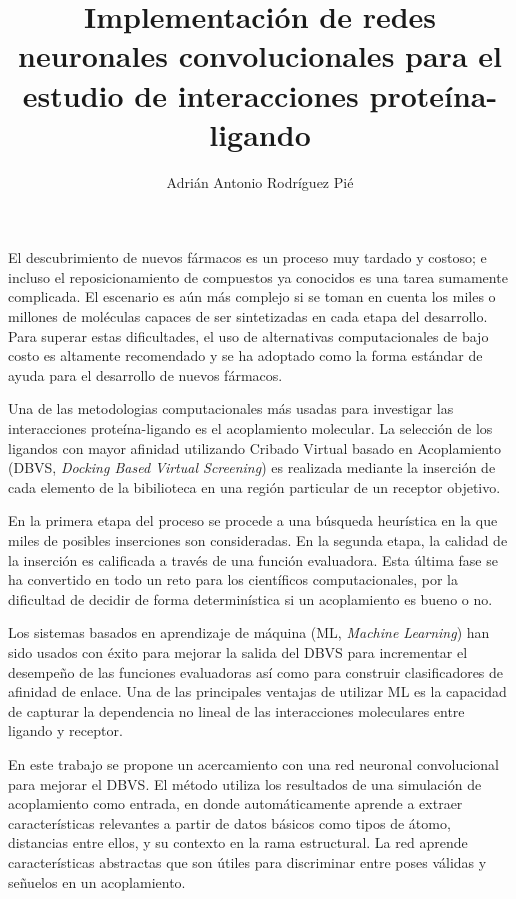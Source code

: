 \documentclass{article}
\begin{document}
\title{Implementación de redes neuronales convolucionales para el estudio de interacciones proteína-ligando}
\author{Adrián Antonio Rodríguez Pié}
\date{}

\maketitle
El descubrimiento de nuevos fármacos es un proceso muy tardado y
costoso; e incluso el reposicionamiento de compuestos ya conocidos es
una tarea sumamente complicada. El escenario es aún más complejo si
se toman en cuenta los miles o millones de moléculas capaces de ser
sintetizadas en cada etapa del desarrollo.  Para superar estas
dificultades, el uso de alternativas computacionales de bajo costo es
altamente recomendado y se ha adoptado como la forma estándar de
ayuda para el desarrollo de nuevos fármacos.

Una de las metodologias computacionales más usadas para investigar las
interacciones proteína-ligando es el acoplamiento molecular. La
selección de los ligandos con mayor afinidad utilizando Cribado
Virtual basado en Acoplamiento (DBVS, \textit{Docking Based Virtual
  Screening}) es realizada mediante la inserción de cada elemento de
la bibilioteca en una región particular de un receptor objetivo.

En la primera etapa del proceso se procede a una búsqueda heurística
en la que miles de posibles inserciones son consideradas. En la
segunda etapa, la calidad de la inserción es calificada a través de
una función evaluadora. Esta última fase se ha convertido en todo un
reto para los científicos computacionales, por la dificultad de
decidir de forma determinística si un acoplamiento es bueno o no.

Los sistemas basados en aprendizaje de máquina (ML, \textit{Machine
  Learning}) han sido usados con éxito para mejorar la salida del DBVS
para incrementar el desempeño de las funciones evaluadoras así como
para construir clasificadores de afinidad de enlace. Una de las
principales ventajas de utilizar ML es la capacidad de capturar la
dependencia no lineal de las interacciones moleculares entre ligando y
receptor.

En este trabajo se propone un acercamiento con una red neuronal
convolucional para mejorar el DBVS. El método utiliza los resultados
de una simulación de acoplamiento como entrada, en donde
automáticamente aprende a extraer características relevantes a partir
de datos básicos como tipos de átomo, distancias entre ellos, y su
contexto en la rama estructural. La red aprende características
abstractas que son útiles para discriminar entre poses válidas y
señuelos en un acoplamiento.
\end{document}
